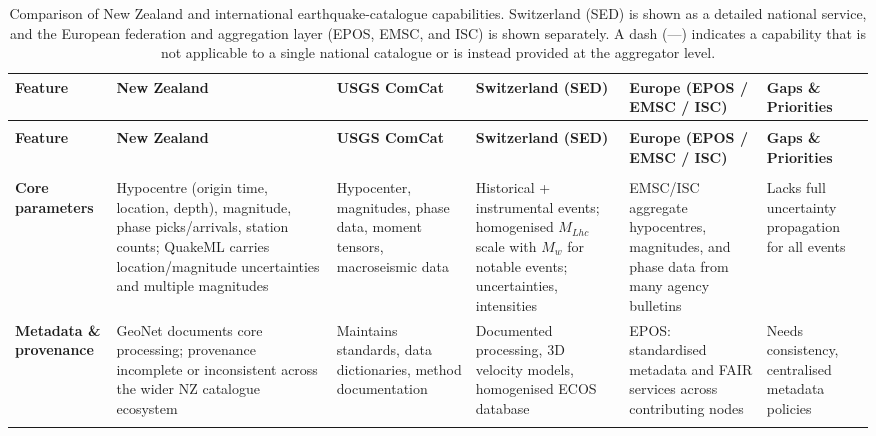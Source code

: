 \documentclass[11pt]{article}
\begin{document}
\begin{landscape}
\begin{longtable}{@{}>{\raggedright\arraybackslash}p{2.2cm}>{\raggedright\arraybackslash}p{3.3cm}>{\raggedright\arraybackslash}p{2.9cm}>{\raggedright\arraybackslash}p{3.0cm}>{\raggedright\arraybackslash}p{3.0cm}>{\raggedright\arraybackslash}p{2.7cm}@{}}
\caption{Comparison of New Zealand and international earthquake-catalogue capabilities. Switzerland (SED) is shown as a detailed national service, and the European federation and aggregation layer (EPOS, EMSC, and ISC) is shown separately. A dash (---) indicates a capability that is not applicable to a single national catalogue or is instead provided at the aggregator level.}
\label{tab:catalog_comparison} \\
\toprule
\textbf{Feature} & \textbf{New Zealand} & \textbf{USGS ComCat} & \textbf{Switzerland (SED)} & \textbf{Europe (EPOS / EMSC / ISC)} & \textbf{Gaps \& Priorities} \\
\midrule
\endfirsthead

\multicolumn{6}{c}{\tablename\ \thetable{} -- \textit{continued}} \\
\toprule
\textbf{Feature} & \textbf{New Zealand} & \textbf{USGS ComCat} & \textbf{Switzerland (SED)} & \textbf{Europe (EPOS / EMSC / ISC)} & \textbf{Gaps \& Priorities} \\
\midrule
\endhead

\midrule
\multicolumn{6}{r}{\textit{Continued on next page}} \\
\endfoot

\bottomrule
\endlastfoot

\textbf{Core parameters} &
Hypocentre (origin time, location, depth), magnitude, phase picks/arrivals, station counts; QuakeML carries location/magnitude uncertainties and multiple magnitudes \citep{GeoNetEqCatalogue, gns_neid} &
Hypocenter, magnitudes, phase data, moment tensors, macroseismic data \citep{usgs_comcat} &
Historical + instrumental events; homogenised $M_{Lhc}$ scale with $M_w$ for notable events; uncertainties, intensities \citep{sed_report} &
EMSC/ISC aggregate hypocentres, magnitudes, and phase data from many agency bulletins \citep{isc_data_collection, emsc_webservices} &
Lacks full uncertainty propagation for all events \\
\addlinespace

\textbf{Metadata \& provenance} &
GeoNet documents core processing; provenance incomplete or inconsistent across the wider NZ catalogue ecosystem &
Maintains standards, data dictionaries, method documentation \citep{usgs_comcat} &
Documented processing, 3D velocity models, homogenised ECOS database \citep{sed_report, ECOS09} &
EPOS: standardised metadata and FAIR services across contributing nodes \citep{EPOSSeisTCS} &
Needs consistency, centralised metadata policies \\
\addlinespace


\end{longtable}
\end{landscape}
\end{document}
